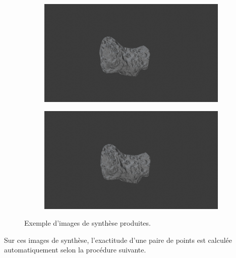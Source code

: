 \documentclass[
	a4paper, %
	10pt, %
	unnumberedsections, %
	twoside, %
]{LTJournalArticle}
\begin{document}
\begin{figure}[H]
	\centering
	\begin{subfigure}[H]{\columnwidth}
		\centering
		\includegraphics[width=\textwidth]{images/rocks_2_10_deg_higher_distance_left.png}
	\end{subfigure}
	\begin{subfigure}[H]{\columnwidth}
		\centering
		\includegraphics[width=\textwidth]{images/rocks_2_10_deg_higher_distance_right.png}
	\end{subfigure}
	\caption{Exemple d'images de synthèse produites.}
	\label{figure:blender_example}
\end{figure}
Sur ces images de synthèse, l'exactitude d'une paire de points est calculée automatiquement selon la procédure suivante.
\end{document}
